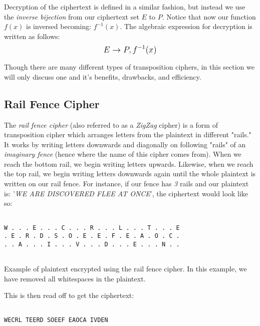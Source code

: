 Decryption of the ciphertext is defined in a similar fashion, but instead we use the \textit{inverse bijection} from our ciphertext set $E$ to $P$. 
Notice that now our function $f(x)$ is inversed becoming: $f^{-1}(x)$. The algebraic expression for decryption is written as follows: 
$$\mathlarger{E \rightarrow P, f^{-1}(x)}$$

Though there are many different types of transposition ciphers, in this section we will only discuss one and it's benefits, drawbacks, and efficiency.

\subsection{Rail Fence Cipher}

The \textit{rail fence cipher} (also referred to as a \textit{ZigZag} cipher) is a form of transposition cipher which arranges letters from
the plaintext in different "rails." It works by writing letters downwards and diagonally on following "rails" of an 
\textit{imaginary fence} (hence where the name of this cipher comes from). When we reach the bottom rail, we begin writing 
letters upwards. Likewise, when we reach the top rail, we begin writing letters downwards again until the whole plaintext is
written on our rail fence. For instance, if our fence has \textit{3} rails and our plaintext is:
'\textit{WE ARE DISCOVERED FLEE AT ONCE}', the ciphertext would look like so:

\begin{listing}[H]
    \begin{verbatim}
    
W . . . E . . . C . . . R . . . L . . . T . . . E
. E . R . D . S . O . E . E . F . E . A . O . C .
. . A . . . I . . . V . . . D . . . E . . . N . .
    
    \end{verbatim}
    \caption{Example of plaintext encrypted using the rail fence cipher. In this example, we have removed
    all whitespaces in the plaintext.}
\end{listing}

This is then read off to get the ciphertext:

\begin{verbatim}
    
WECRL TEERD SOEEF EAOCA IVDEN
\end{verbatim}

